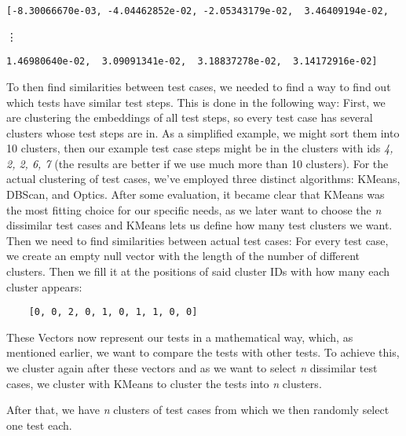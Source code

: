 \begin{Verbatim}
[-8.30066670e-03, -4.04462852e-02, -2.05343179e-02,  3.46409194e-02,
\end{Verbatim}
\vdots
\begin{Verbatim}
1.46980640e-02,  3.09091341e-02,  3.18837278e-02,  3.14172916e-02]
\end{Verbatim}

To then find similarities between test cases, we needed to find a way to find out which tests have similar test steps. This is done in the following way:
First, we are clustering the embeddings of all test steps, so every test case has several clusters whose test steps are in. As a simplified example, we might sort them into 10 clusters, then our example test case steps might be in the clusters with ids \emph{4, 2, 2, 6, 7} (the results are better if we use much more than 10 clusters).
For the actual clustering of test cases, we've employed three distinct algorithms: KMeans, DBScan, and Optics. After some evaluation, it became clear that KMeans was the most fitting choice for our specific needs, as we later want to choose the \emph{n} dissimilar test cases and KMeans lets us define how many test clusters we want.
Then we need to find similarities between actual test cases:
For every test case, we create an empty null vector with the length of the number of different clusters. Then we fill it at the positions of said cluster IDs with how many each cluster appears:

\begin{Verbatim}
    [0, 0, 2, 0, 1, 0, 1, 1, 0, 0]
\end{Verbatim}

These Vectors now represent our tests in a mathematical way, which, as mentioned earlier, we want to compare the tests with other tests.
To achieve this, we cluster again after these vectors and as we want to select \emph{n} dissimilar test cases, we cluster with KMeans to cluster the tests into \emph{n} clusters.

After that, we have \emph{n} clusters of test cases from which we then randomly select one test each. 

